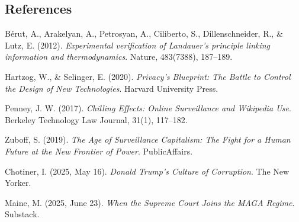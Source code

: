 \subsection{References}\label{references}

Bérut, A., Arakelyan, A., Petrosyan, A., Ciliberto, S., Dillenschneider,
R., \& Lutz, E. (2012). \emph{Experimental verification of Landauer's
principle linking information and thermodynamics}. Nature, 483(7388),
187--189.

Hartzog, W., \& Selinger, E. (2020). \emph{Privacy's Blueprint: The
Battle to Control the Design of New Technologies}. Harvard University
Press.

Penney, J. W. (2017). \emph{Chilling Effects: Online Surveillance and
Wikipedia Use}. Berkeley Technology Law Journal, 31(1), 117--182.

Zuboff, S. (2019). \emph{The Age of Surveillance Capitalism: The Fight
for a Human Future at the New Frontier of Power}. PublicAffairs.

Chotiner, I. (2025, May 16). \emph{Donald Trump's Culture of
Corruption}. The New Yorker.

Maine, M. (2025, June 23). \emph{When the Supreme Court Joins the MAGA
Regime}. Substack.
